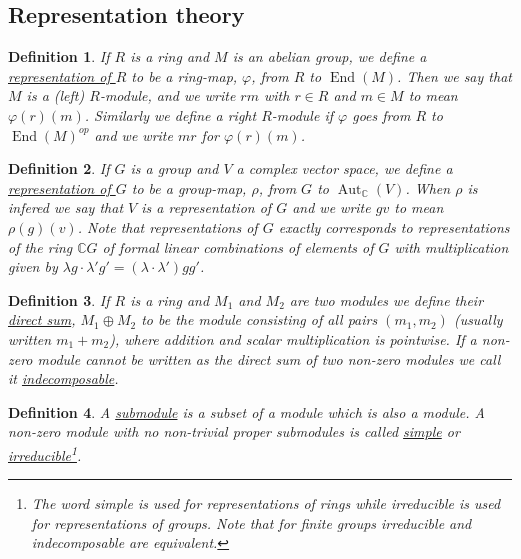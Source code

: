 \documentclass[11pt, a4paper, english]{article}
\numberwithin{prop}{section}
\numberwithin{lemma}{section}
\numberwithin{theorem}{section}
\newtheorem{defin}{Definition}
\numberwithin{defin}{section}
\numberwithin{example}{section}
\newcommand{\C}{\mathbb{C}}
\DeclareMathOperator{\End}{End}
\DeclareMathOperator{\Aut}{Aut}
\begin{document}
\begin{appendices}
\section{Representation theory}
\label{appendix}

\begin{defin}
If $R$ is a ring and $M$ is an abelian group, we define a \underline{representation of $R$} to be a ring-map, $\varphi$, from $R$ to $\End(M)$. Then we say that $M$ is a (left) $R$-module, and we write $rm$ with $r \in R$ and $m \in M$ to mean $\varphi(r)(m)$. Similarly we define a right $R$-module if $\varphi$ goes from $R$ to $\End(M)^{op}$ and we write $mr$ for $\varphi(r)(m)$.
\end{defin}

\begin{defin}
If $G$ is a group and $V$ a complex vector space, we define a \underline{representation of $G$} to be a group-map, $\rho$, from $G$ to $\Aut_\C(V)$. When $\rho$ is infered we say that $V$ is a representation of $G$ and we write $gv$ to mean $\rho(g)(v)$. Note that representations of $G$ exactly corresponds to representations of the ring $\C G$ of formal linear combinations of elements of $G$ with multiplication given by $\lambda g \cdot \lambda' g' = (\lambda \cdot \lambda')gg'$.
\end{defin}

\begin{defin}
If $R$ is a ring and $M_1$ and $M_2$ are two modules we define their \underline{direct sum}, $M_1 \oplus M_2$ to be the module consisting of all pairs $(m_1, m_2)$ (usually written $m_1 + m_2$), where addition and scalar multiplication is pointwise. If a non-zero module cannot be written as the direct sum of two non-zero modules we call it \underline{indecomposable}.
\end{defin}

\begin{defin}
A \underline{submodule} is a subset of a module which is also a module. A non-zero module with no non-trivial proper submodules is called \underline{simple} or \underline{irreducible}\footnote{The word simple is used for representations of rings while irreducible is used for representations of groups. Note that for finite groups irreducible and indecomposable are equivalent.}.
\end{defin}


\end{appendices}
\end{document}
